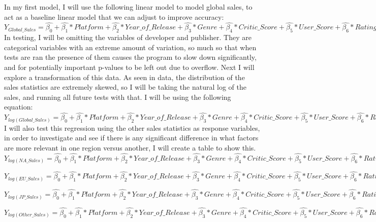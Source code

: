 \documentclass[12pt]{article}
\begin{document}
In my first model, I will use the following linear model to model global sales, to act as a baseline linear model that we can adjust to improve accuracy:
$Y_{Global\_Sales}=\hat{\beta_{0}}+\hat{\beta_{1}}*Platform+\hat{\beta_{2}}*Year\_of\_Release+\hat{\beta_{3}}*Genre+\hat{\beta_{4}}*Critic\_Score+\hat{\beta_{5}}*User\_Score+\hat{\beta_{6}}*Rating+\hat{\beta_{7}}*Critic\_Count+\hat{\beta_{8}}*Critic\_Count$
In testing, I will be omitting the variables of developer and publisher. They are categorical variables with an extreme amount of variation,
so much so that when tests are ran the presence of them causes the program to slow down significantly, and for potentially important p-values to be left out due to overflow.
Next I will explore a transformation of this data. As seen in data, the distribution of the sales statistics are extremely skewed, so I will be taking  
the natural log of the sales, and running all future tests with that. I will be using the following equation:
$Y_{log(Global\_Sales)}=\hat{\beta_{0}}+\hat{\beta_{1}}*Platform+\hat{\beta_{2}}*Year\_of\_Release+\hat{\beta_{3}}*Genre+\hat{\beta_{4}}*Critic\_Score+\hat{\beta_{5}}*User\_Score+\hat{\beta_{6}}*Rating+\hat{\beta_{7}}*Critic\_Count+\hat{\beta_{8}}*Critic\_Count$
I will also test this regression using the other sales statistics as response variables, in order to investigate and see if there is any significant difference in what factors are more relevant in one region versus another, I will create a table to show this.
$Y_{log(NA\_Sales)}=\hat{\beta_{0}}+\hat{\beta_{1}}*Platform+\hat{\beta_{2}}*Year\_of\_Release+\hat{\beta_{3}}*Genre+\hat{\beta_{4}}*Critic\_Score+\hat{\beta_{5}}*User\_Score+\hat{\beta_{6}}*Rating+\hat{\beta_{7}}*Critic\_Count+\hat{\beta_{8}}*Critic\_Count$

$Y_{log(EU\_Sales)}=\hat{\beta_{0}}+\hat{\beta_{1}}*Platform+\hat{\beta_{2}}*Year\_of\_Release+\hat{\beta_{3}}*Genre+\hat{\beta_{4}}*Critic\_Score+\hat{\beta_{5}}*User\_Score+\hat{\beta_{6}}*Rating+\hat{\beta_{7}}*Critic\_Count+\hat{\beta_{8}}*Critic\_Count$

$Y_{log(JP\_Sales)}=\hat{\beta_{0}}+\hat{\beta_{1}}*Platform+\hat{\beta_{2}}*Year\_of\_Release+\hat{\beta_{3}}*Genre+\hat{\beta_{4}}*Critic\_Score+\hat{\beta_{5}}*User\_Score+\hat{\beta_{6}}*Rating+\hat{\beta_{7}}*Critic\_Count+\hat{\beta_{8}}*Critic\_Count$

$Y_{log(Other\_Sales)}=\hat{\beta_{0}}+\hat{\beta_{1}}*Platform+\hat{\beta_{2}}*Year\_of\_Release+\hat{\beta_{3}}*Genre+\hat{\beta_{4}}*Critic\_Score+\hat{\beta_{5}}*User\_Score+\hat{\beta_{6}}*Rating+\hat{\beta_{7}}*Critic\_Count+\hat{\beta_{8}}*Critic\_Count$
\end{document}
